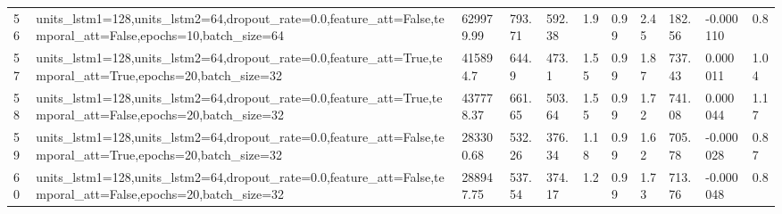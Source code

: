 \begin{longtable}{C{0.8cm} L{2cm} C{1.15cm} C{1.15cm} C{1.15cm} C{1.15cm} C{0.85cm} C{1.25cm} C{1.2cm} C{1.5cm} C{1.0cm}}
56 & units\_lstm1=128,\newline units\_lstm2=64,\newline dropout\_rate=0.0,\newline feature\_att=False,\newline temporal\_att=False,\newline epochs=10,\newline batch\_size=64 & 629979.99 & 793.71 & 592.38 & 1.9 & 0.99 & 2.45 & 182.56 & -0.000110 & 0.8 \\
57 & units\_lstm1=128,\newline units\_lstm2=64,\newline dropout\_rate=0.0,\newline feature\_att=True,\newline temporal\_att=True,\newline epochs=20,\newline batch\_size=32 & 415894.7 & 644.9 & 473.1 & 1.55 & 0.99 & 1.87 & 737.43 & 0.000011 & 1.04 \\
58 & units\_lstm1=128,\newline units\_lstm2=64,\newline dropout\_rate=0.0,\newline feature\_att=True,\newline temporal\_att=False,\newline epochs=20,\newline batch\_size=32 & 437778.37 & 661.65 & 503.64 & 1.55 & 0.99 & 1.72 & 741.08 & 0.000044 & 1.17 \\
59 & units\_lstm1=128,\newline units\_lstm2=64,\newline dropout\_rate=0.0,\newline feature\_att=False,\newline temporal\_att=True,\newline epochs=20,\newline batch\_size=32 & 283300.68 & 532.26 & 376.34 & 1.18 & 0.99 & 1.62 & 705.78 & -0.000028 & 0.87 \\
60 & units\_lstm1=128,\newline units\_lstm2=64,\newline dropout\_rate=0.0,\newline feature\_att=False,\newline temporal\_att=False,\newline epochs=20,\newline batch\_size=32 & 288947.75 & 537.54 & 374.17 & 1.2 & 0.99 & 1.73 & 713.76 & -0.000048 & 0.8 \\

\end{longtable}
